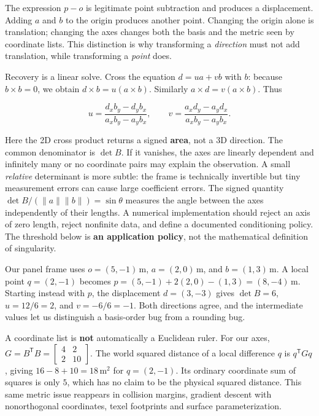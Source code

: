 The expression \(p-o\) is legitimate point subtraction and produces a displacement. Adding \(a\) and \(b\) to the origin produces another point. Changing the origin alone is translation; changing the axes changes both the basis and the metric seen by coordinate lists. This distinction is why transforming a \emph{direction} must not add translation, while transforming a \emph{point} does.

Recovery is a linear solve. Cross the equation \(d=ua+vb\) with \(b\): because \(b\times b=0\), we obtain \(d\times b=u(a\times b)\). Similarly \(a\times d=v(a\times b)\). Thus

\[
u=\frac{d_xb_y-d_yb_x}{a_xb_y-a_yb_x},
\qquad
v=\frac{a_xd_y-a_yd_x}{a_xb_y-a_yb_x}.
\]

Here the 2D cross product returns a signed \textbf{area}, not a 3D direction. The common denominator is \(\det B\). If it vanishes, the axes are linearly dependent and infinitely many or no coordinate pairs may explain the observation. A small \emph{relative} determinant is more subtle: the frame is technically invertible but tiny measurement errors can cause large coefficient errors. The signed quantity \(\det B/(\|a\|\|b\|)=\sin\theta\) measures the angle between the axes independently of their lengths. A numerical implementation should reject an axis of zero length, reject nonfinite data, and define a documented conditioning policy. The threshold below is \textbf{an application policy}, not the mathematical definition of singularity.

Our panel frame uses \(o=(5,-1)\,\mathrm m\), \(a=(2,0)\,\mathrm m\), and \(b=(1,3)\,\mathrm m\). A local point \(q=(2,-1)\) becomes \(p=(5,-1)+2(2,0)-(1,3)=(8,-4)\,\mathrm m\). Starting instead with \(p\), the displacement \(d=(3,-3)\) gives \(\det B=6\), \(u=12/6=2\), and \(v=-6/6=-1\). Both directions agree, and the intermediate values let us distinguish a basis-order bug from a rounding bug.

A coordinate list is \textbf{not} automatically a Euclidean ruler. For our axes, \(G=B^\mathsf{T}B=\left[\begin{smallmatrix}4&2\\2&10\end{smallmatrix}\right]\). The world squared distance of a local difference \(q\) is \(q^\mathsf{T}Gq\), giving \(16-8+10=18\,\mathrm m^2\) for \(q=(2,-1)\). Its ordinary coordinate sum of squares is only \(5\), which has no claim to be the physical squared distance. This same metric issue reappears in collision margins, gradient descent with nonorthogonal coordinates, texel footprints and surface parameterization.


